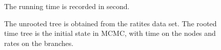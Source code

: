\documentclass{bmcart}
\begin{document}
\begin{backmatter}
\begin{figure}[h!]
\centering
{}
\caption{
             The running time is recorded in second.}
\label{eff_comp2}
\end{figure}

\begin{figure}[h!]
\centering
{}
\caption{
            The unrooted tree is obtained from the ratites data set. The rooted time tree is the initial state in MCMC, with time on the nodes and rates on the branches.}
\label{withoutdata}
\end{figure}


\end{backmatter}
\end{document}
